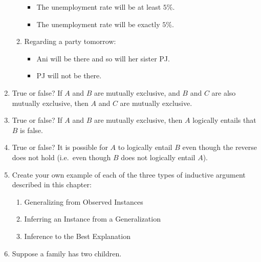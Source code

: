 \documentclass[justified]{tufte-book}
\providecommand{\tightlist}{%
  \setlength{\itemsep}{0pt}\setlength{\parskip}{0pt}}
\theoremstyle{definition}
\theoremstyle{definition}
\theoremstyle{definition}
\theoremstyle{definition}
\theoremstyle{remark}
\begin{document}
\begin{enumerate}
\begin{enumerate}
    \begin{itemize}
    \tightlist
    \item
      The unemployment rate will be at least \(5\%\).
    \item
      The unemployment rate will be exactly \(5\%\).
    \end{itemize}
  \item
    Regarding a party tomorrow:

    \begin{itemize}
    \tightlist
    \item
      Ani will be there and so will her sister PJ.
    \item
      PJ will not be there.
    \end{itemize}
  \end{enumerate}
\item
  True or false? If \(A\) and \(B\) are mutually exclusive, and \(B\) and \(C\) are also mutually exclusive, then \(A\) and \(C\) are mutually exclusive.
\item
  True or false? If \(A\) and \(B\) are mutually exclusive, then \(A\) logically entails that \(B\) is false.
\item
  True or false? It is possible for \(A\) to logically entail \(B\) even though the reverse does not hold (i.e.~even though \(B\) does not logically entail \(A\)).
\item
  Create your own example of each of the three types of inductive argument described in this chapter:

  \begin{enumerate}
  \def\labelenumii{\alph{enumii}.}
  \tightlist
  \item
    Generalizing from Observed Instances
  \item
    Inferring an Instance from a Generalization
  \item
    Inference to the Best Explanation
  \end{enumerate}
\item
  Suppose a family has two children.


\end{enumerate}
\end{document}

